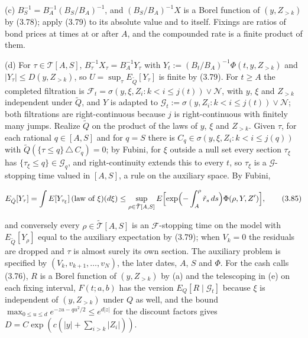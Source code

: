 \documentclass[11pt]{article}
\begin{document}
(c) \(B_S^{-1} = B_A^{-1} (B_S / B_A)^{-1}\), and \((B_S / B_A)^{-1} X\) is a Borel function of \((y, Z_{>k})\) by (3.78); apply (3.79) to its absolute value and to itself. Fixings are ratios of bond prices at times at or after \(A\), and the compounded rate is a finite product of them.

(d) For \(\tau \in \mathcal T[A, S]\), \(B_\tau^{-1} X_\tau = B_A^{-1} Y_\tau\) with \(Y_t := (B_t / B_A)^{-1} \Phi(t, y, Z_{>k})\) and \(|Y_\tau| \le D(y, Z_{>k})\), so \(U = \sup_\tau E_{\tilde Q}[Y_\tau]\) is finite by (3.79). For \(t \ge A\) the completed filtration is \(\mathcal F_t = \sigma(y, \xi, Z_i : k < i \le j(t)) \vee \mathcal N\), with \(y\), \(\xi\) and \(Z_{>k}\) independent under \(\tilde Q\), and \(Y\) is adapted to \(\mathcal G_t := \sigma(y, Z_i : k < i \le j(t)) \vee \mathcal N\); both filtrations are right-continuous because \(j\) is right-continuous with finitely many jumps. Realize \(\tilde Q\) on the product of the laws of \(y\), \(\xi\) and \(Z_{>k}\). Given \(\tau\), for each rational \(q \in [A, S]\) and for \(q = S\) there is \(C_q \in \sigma(y, \xi, Z_i : k < i \le j(q))\) with \(\tilde Q(\{\tau \le q\} \,\triangle\, C_q) = 0\); by Fubini, for \(\xi\) outside a null set every section \(\tau_\xi\) has \(\{\tau_\xi \le q\} \in \mathcal G_q\), and right-continuity extends this to every \(t\), so \(\tau_\xi\) is a \(\mathcal G\)-stopping time valued in \([A, S]\), a rule on the auxiliary space. By Fubini,

\begin{equation*}
E_{\tilde Q}[Y_\tau] = \int E[Y_{\tau_\xi}]\,(\text{law of } \xi)(d\xi) \le \sup_{\rho \in \tilde{\mathcal T}[A, S]} E\Bigl[ \exp\Bigl( -\int_A^\rho \tilde r_s\,ds \Bigr) \Phi(\rho, Y, Z') \Bigr], \tag{3.85}\label{eq:3.85}
\end{equation*}

and conversely every \(\rho \in \tilde{\mathcal T}[A, S]\) is an \(\mathcal F\)-stopping time on the model with \(E_{\tilde Q}[Y_\rho]\) equal to the auxiliary expectation by (3.79); when \(V_k = 0\) the residuals are dropped and \(\tau\) is almost surely its own section. The auxiliary problem is specified by \((V_k, v_{k+1}, \dots, v_N)\), the later dates, \(A\), \(S\) and \(\Phi\). For the cash calls (3.76), \(R\) is a Borel function of \((y, Z_{>k})\) by (a) and the telescoping in (e) on each fixing interval, \(F(t; a, b)\) has the version \(E_Q[R \mid \mathcal G_t]\) because \(\xi\) is independent of \((y, Z_{>k})\) under \(Q\) as well, and the bound \(\max_{0 \le u \le d} e^{-zu - qu^2/2} \le e^{d|z|}\) for the discount factors gives \(D = C \exp(c(|y| + \sum_{i > k} |Z_i|))\).
\end{document}
